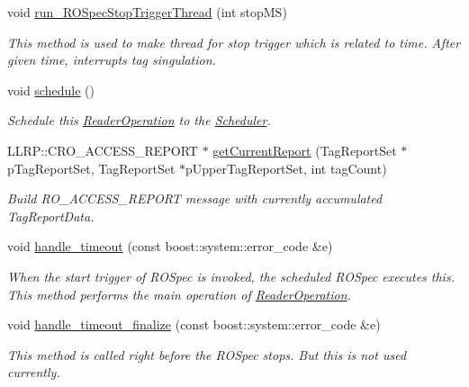 \begin{DoxyCompactItemize}
void \hyperlink{class_e_l_f_i_n_1_1_reader_operation_a97729b155d5f48fff0411d7ab500e737}{run\-\_\-\-R\-O\-Spec\-Stop\-Trigger\-Thread} (int stop\-M\-S)
\begin{DoxyCompactList}\small\item\em This method is used to make thread for stop trigger which is related to time. After given time, interrupts tag singulation. \end{DoxyCompactList}\item 
void \hyperlink{class_e_l_f_i_n_1_1_reader_operation_af0a5fbd8e670cf99939088f8f8b6582f}{schedule} ()
\begin{DoxyCompactList}\small\item\em Schedule this \hyperlink{class_e_l_f_i_n_1_1_reader_operation}{Reader\-Operation} to the \hyperlink{class_e_l_f_i_n_1_1_scheduler}{Scheduler}. \end{DoxyCompactList}\item 
L\-L\-R\-P\-::\-C\-R\-O\-\_\-\-A\-C\-C\-E\-S\-S\-\_\-\-R\-E\-P\-O\-R\-T $\ast$ \hyperlink{class_e_l_f_i_n_1_1_reader_operation_acc22207efd6fa0a5fbbf7d1bcda7b3f9}{get\-Current\-Report} (Tag\-Report\-Set $\ast$p\-Tag\-Report\-Set, Tag\-Report\-Set $\ast$p\-Upper\-Tag\-Report\-Set, int tag\-Count)
\begin{DoxyCompactList}\small\item\em Build R\-O\-\_\-\-A\-C\-C\-E\-S\-S\-\_\-\-R\-E\-P\-O\-R\-T message with currently accumulated Tag\-Report\-Data. \end{DoxyCompactList}\item 
void \hyperlink{class_e_l_f_i_n_1_1_reader_operation_a5fe3a421c97daf9cb398d88d79c2b0c1}{handle\-\_\-timeout} (const boost\-::system\-::error\-\_\-code \&e)
\begin{DoxyCompactList}\small\item\em When the start trigger of R\-O\-Spec is invoked, the scheduled R\-O\-Spec executes this. This method performs the main operation of \hyperlink{class_e_l_f_i_n_1_1_reader_operation}{Reader\-Operation}. \end{DoxyCompactList}\item 
void \hyperlink{class_e_l_f_i_n_1_1_reader_operation_a611b3083a92137796e04391cc6c5d9c3}{handle\-\_\-timeout\-\_\-finalize} (const boost\-::system\-::error\-\_\-code \&e)
\begin{DoxyCompactList}\small\item\em This method is called right before the R\-O\-Spec stops. But this is not used currently. \end{DoxyCompactList}\end{DoxyCompactItemize}
